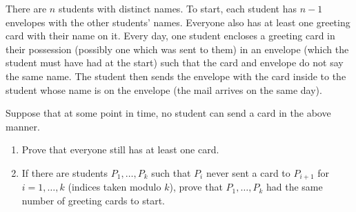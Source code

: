 There are $n$ students with distinct names. To start, each student has $n-1$ envelopes with the other students' names. Everyone also has at least one greeting card with their name on it. Every day, one student encloses a greeting card in their possession (possibly one which was sent to them) in an envelope (which the student must have had at the start) such that the card and envelope do not say the same name. The student then sends the envelope with the card inside to the student whose name is on the envelope (the mail arrives on the same day).

Suppose that at some point in time, no student can send a card in the above manner.
\begin{enumerate}[label=(\roman*)]
	\item Prove that everyone still has at least one card.
	\item If there are students $P_1,\ldots,P_k$ such that $P_i$ never sent a card to $P_{i+1}$ for $i=1,\ldots,k$ (indices taken modulo $k$), prove that $P_1,\ldots,P_k$ had the same number of greeting cards to start.
\end{enumerate}